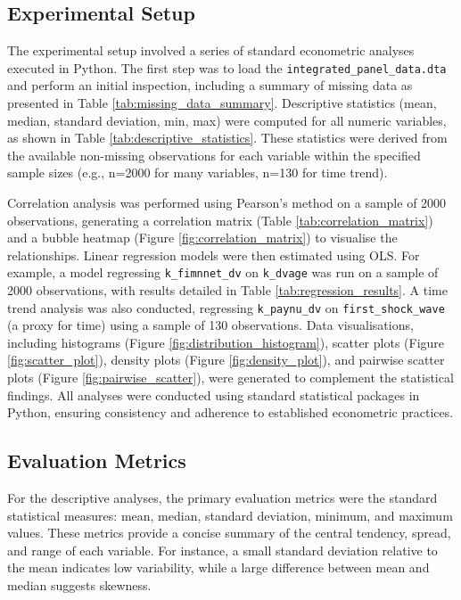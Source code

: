 \documentclass[11pt,a4paper]{article}
\begin{document}
\subsection{Experimental Setup}

The experimental setup involved a series of standard econometric analyses executed in Python. The first step was to load the \texttt{integrated\_panel\_data.dta} and perform an initial inspection, including a summary of missing data as presented in Table \ref{tab:missing_data_summary}. Descriptive statistics (mean, median, standard deviation, min, max) were computed for all numeric variables, as shown in Table \ref{tab:descriptive_statistics}. These statistics were derived from the available non-missing observations for each variable within the specified sample sizes (e.g., n=2000 for many variables, n=130 for time trend).

Correlation analysis was performed using Pearson's method on a sample of 2000 observations, generating a correlation matrix (Table \ref{tab:correlation_matrix}) and a bubble heatmap (Figure \ref{fig:correlation_matrix}) to visualise the relationships. Linear regression models were then estimated using OLS. For example, a model regressing \texttt{k\_fimnnet\_dv} on \texttt{k\_dvage} was run on a sample of 2000 observations, with results detailed in Table \ref{tab:regression_results}. A time trend analysis was also conducted, regressing \texttt{k\_paynu\_dv} on \texttt{first\_shock\_wave} (a proxy for time) using a sample of 130 observations. Data visualisations, including histograms (Figure \ref{fig:distribution_histogram}), scatter plots (Figure \ref{fig:scatter_plot}), density plots (Figure \ref{fig:density_plot}), and pairwise scatter plots (Figure \ref{fig:pairwise_scatter}), were generated to complement the statistical findings. All analyses were conducted using standard statistical packages in Python, ensuring consistency and adherence to established econometric practices.

\subsection{Evaluation Metrics}

For the descriptive analyses, the primary evaluation metrics were the standard statistical measures: mean, median, standard deviation, minimum, and maximum values. These metrics provide a concise summary of the central tendency, spread, and range of each variable. For instance, a small standard deviation relative to the mean indicates low variability, while a large difference between mean and median suggests skewness.
\end{document}
